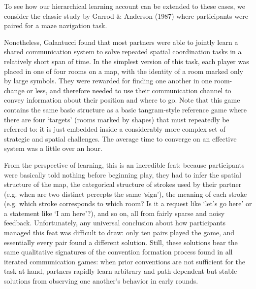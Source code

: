 \documentclass[11pt, floatsintext, jou]{apa6}
\begin{document}
To see how our hierarchical learning account can be extended to these cases, we consider the classic study by Garrod \& Anderson (1987) where participants were paired for a maze navigation task. 


Nonetheless, Galantucci found that most partners were able to jointly learn a shared communication system to solve repeated spatial coordination tasks in a relatively short span of time. In the simplest version of this task, each player was placed in one of four rooms on a map, with the identity of a room marked only by large symbols. They were rewarded for finding one another in one room-change or less, and therefore needed to use their communication channel to convey information about their position and where to go. Note that this game contains the same basic structure as a basic tangram-style reference game where there are four `targets' (rooms marked by shapes) that must repeatedly be referred to: it is just embedded inside a considerably more complex set of strategic and spatial challenges. The average time to converge on an effective system was a little over an hour. 

From the perspective of learning, this is an incredible feat: because participants were basically told nothing before beginning play, they had to infer the spatial structure of the map, the categorical structure of strokes used by their partner (e.g. when are two distinct percepts the same `sign'), the meaning of each stroke (e.g. which stroke corresponds to which room? Is it a request like `let's go here' or a statement like `I am here'?), and so on, all from fairly sparse and noisy feedback. Unfortunately, any universal conclusion about how participants managed this feat was difficult to draw: only ten pairs played the game, and essentially every pair found a different solution. Still, these solutions bear the same qualitative signatures of the convention formation process found in all iterated communication games: when prior conventions are not sufficient for the task at hand, partners rapidly learn arbitrary and path-dependent but stable solutions from observing one another's behavior in early rounds. 
\end{document}
